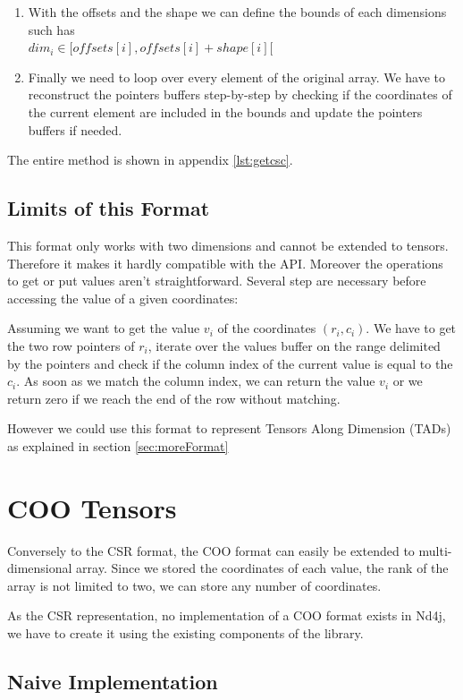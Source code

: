 \begin{enumerate}
\item With the offsets and the shape we can define the bounds of each dimensions such has \\
$dim_{i} \in [offsets[i], offsets[i] + shape[i][$
\item Finally we need to loop over every element of the original array. We have to reconstruct the pointers buffers step-by-step by checking if the coordinates of the current element are included in the bounds and update the pointers buffers if needed.
\end{enumerate}

The entire method is shown in appendix \ref{lst:getcsc}.

\subsection{Limits of this Format}

This format only works with two dimensions and cannot be extended to tensors. Therefore it makes it hardly compatible with the API.
Moreover the operations to get or put values aren't straightforward. Several step are necessary before accessing the value of a given coordinates:

Assuming we want to get the value $v_{i}$ of the coordinates $(r_{i}, c_{i})$.
 We have to get the two row pointers of $r_{i}$, iterate over the values buffer on the range delimited by the pointers and check if the column index of the current value is equal to the $c_{i}$. As soon as we match the column index, we can return the value $v_{i}$ or we return zero if we reach the end of the row without matching.

However we could use this format to represent Tensors Along Dimension (TADs) as explained in section \ref{sec:moreFormat}

\section{COO Tensors}

Conversely to the CSR format, the COO format can easily be extended to multi-dimensional array. Since we stored the coordinates of each value, the rank of the array is not limited to two, we can store any number of coordinates.
 
As the CSR representation, no implementation of a COO format exists in Nd4j, we have to create it using the existing components of the library.

\subsection{Naive Implementation} \label{ssec:naiveCoo}

